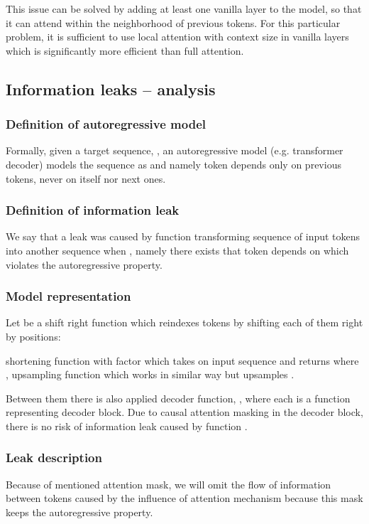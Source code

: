 \documentclass[11pt]{article}
\begin{document}
This issue can be solved by adding at least one vanilla layer to the model, so that it can attend within the neighborhood of  previous tokens. For this particular problem, it is sufficient to use local attention with context size  in vanilla layers which is significantly more efficient than full attention.

\subsection{Information leaks -- analysis}\label{sec:appendix.leak}
\subsubsection{Definition of autoregressive model}
Formally, given a target sequence, , an autoregressive model (e.g. transformer decoder) models the sequence as  and  namely  token depends only on previous tokens, never on itself nor next ones.

\subsubsection{Definition of information leak}
We say that a leak was caused by function  transforming sequence of input tokens  into another sequence  when , namely there exists  that token  depends on  which violates the autoregressive property.

\subsubsection{Model representation}


Let  be a shift right function which reindexes tokens by shifting each of them right by  positions:



 shortening function with factor  which takes on input  sequence and returns  where ,  upsampling function which works in similar way but upsamples .

Between them there is also applied  decoder function, , where each  is a function representing decoder block. Due to causal attention masking in the decoder block, there is no risk of information leak caused by function . 

\subsubsection{Leak description}
Because of mentioned attention mask, we will omit the flow of information between tokens caused by the influence of attention mechanism because this mask keeps the autoregressive property.
\end{document}
